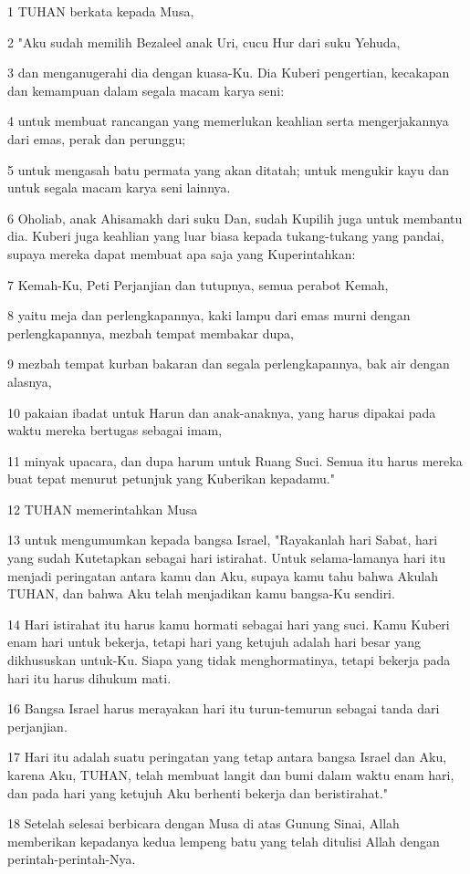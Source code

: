 \par 1 TUHAN berkata kepada Musa,
\par 2 "Aku sudah memilih Bezaleel anak Uri, cucu Hur dari suku Yehuda,
\par 3 dan menganugerahi dia dengan kuasa-Ku. Dia Kuberi pengertian, kecakapan dan kemampuan dalam segala macam karya seni:
\par 4 untuk membuat rancangan yang memerlukan keahlian serta mengerjakannya dari emas, perak dan perunggu;
\par 5 untuk mengasah batu permata yang akan ditatah; untuk mengukir kayu dan untuk segala macam karya seni lainnya.
\par 6 Oholiab, anak Ahisamakh dari suku Dan, sudah Kupilih juga untuk membantu dia. Kuberi juga keahlian yang luar biasa kepada tukang-tukang yang pandai, supaya mereka dapat membuat apa saja yang Kuperintahkan:
\par 7 Kemah-Ku, Peti Perjanjian dan tutupnya, semua perabot Kemah,
\par 8 yaitu meja dan perlengkapannya, kaki lampu dari emas murni dengan perlengkapannya, mezbah tempat membakar dupa,
\par 9 mezbah tempat kurban bakaran dan segala perlengkapannya, bak air dengan alasnya,
\par 10 pakaian ibadat untuk Harun dan anak-anaknya, yang harus dipakai pada waktu mereka bertugas sebagai imam,
\par 11 minyak upacara, dan dupa harum untuk Ruang Suci. Semua itu harus mereka buat tepat menurut petunjuk yang Kuberikan kepadamu."
\par 12 TUHAN memerintahkan Musa
\par 13 untuk mengumumkan kepada bangsa Israel, "Rayakanlah hari Sabat, hari yang sudah Kutetapkan sebagai hari istirahat. Untuk selama-lamanya hari itu menjadi peringatan antara kamu dan Aku, supaya kamu tahu bahwa Akulah TUHAN, dan bahwa Aku telah menjadikan kamu bangsa-Ku sendiri.
\par 14 Hari istirahat itu harus kamu hormati sebagai hari yang suci. Kamu Kuberi enam hari untuk bekerja, tetapi hari yang ketujuh adalah hari besar yang dikhususkan untuk-Ku. Siapa yang tidak menghormatinya, tetapi bekerja pada hari itu harus dihukum mati.
\par 16 Bangsa Israel harus merayakan hari itu turun-temurun sebagai tanda dari perjanjian.
\par 17 Hari itu adalah suatu peringatan yang tetap antara bangsa Israel dan Aku, karena Aku, TUHAN, telah membuat langit dan bumi dalam waktu enam hari, dan pada hari yang ketujuh Aku berhenti bekerja dan beristirahat."
\par 18 Setelah selesai berbicara dengan Musa di atas Gunung Sinai, Allah memberikan kepadanya kedua lempeng batu yang telah ditulisi Allah dengan perintah-perintah-Nya.

